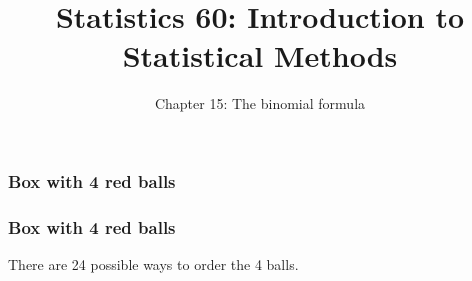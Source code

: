 \documentclass[handout]{beamer}
\title{Statistics 60: Introduction to Statistical Methods}
\subtitle{Chapter 15: The binomial formula}
\author{}%
\begin{document}
   \begin{frame}
   \titlepage
   \end{frame}



   \begin{frame}
   \frametitle{Box with 4 red balls}
   \begin{center}
   \end{center}

   \end{frame}



   \begin{frame}
   \frametitle{Box with 4 red balls}
   \begin{center}
   \end{center}
   There are 24 possible ways to order the 4 balls.
   \end{frame}
\end{document}
